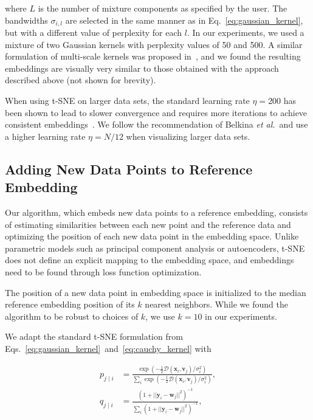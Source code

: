 \documentclass[runningheads]{llncs}
\newcommand{\etal}{\textit{et al.}}
\begin{document}
\noindent where $L$ is the number of mixture components as specified by the user. The bandwidths
$\sigma_{i,l}$ are selected in the same manner as in
Eq.~\ref{eq:gaussian_kernel}, but with a different value of perplexity for each
$l$. In our experiments, we used a mixture of two Gaussian kernels with
perplexity values of 50 and 500. A similar formulation of multi-scale kernels
was proposed in~\cite{Kobak2019}, and we found the resulting embeddings are
visually very similar to those obtained with the approach described above (not
shown for brevity).

When using t-SNE on larger data sets, the standard learning rate $\eta = 200$
has been shown to lead to slower convergence and requires more iterations to
achieve consistent embeddings~\cite{Belkina2019}. We follow the recommendation
of Belkina \etal ~and use a higher learning rate $\eta = N / 12$ when
visualizing larger data sets.


\subsection{Adding New Data Points to Reference Embedding\label{sec:transfer}}

Our algorithm, which embeds new data points to a reference embedding, consists
of estimating similarities between each new point and the reference data and
optimizing the position of each new data point in the embedding space. Unlike
parametric models such as principal component analysis or autoencoders, t-SNE
does not define an explicit mapping to the embedding space, and embeddings need
to be found through loss function optimization.

The position of a new data point in embedding space is initialized to the median
reference embedding position of its $k$ nearest neighbors. While we found the
algorithm to be robust to choices of $k$, we use $k=10$ in our experiments.

We adapt the standard t-SNE formulation from
Eqs.~\ref{eq:gaussian_kernel}~and~\ref{eq:cauchy_kernel} with

\begin{align}
p_{j \mid i} &= \frac{\exp \left ( -\frac{1}{2} \mathcal{D}(\mathbf{x}_i, \mathbf{v}_j) / \sigma_i^2 \right )}{\sum_{i} \exp \left ( -\frac{1}{2} \mathcal{D}(\mathbf{x}_i, \mathbf{v}_j) / \sigma_i^2 \right )}, \\
q_{j \mid i} &= \frac{\left ( 1 + || \mathbf{y}_i - \mathbf{w}_j ||^2 \right )^{-1}}{\sum_{i}\left ( 1 + || \mathbf{y}_i - \mathbf{w}_j ||^2 \right )^{-1}},
\end{align}
\end{document}
